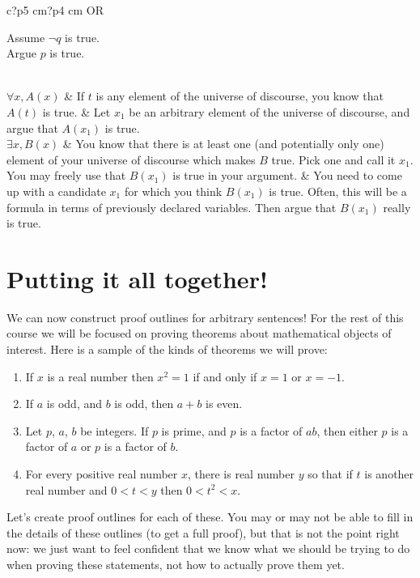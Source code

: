 \begin{table}[h]
\begin{tabular}{c?p{5 cm}?p{4 cm}}
		OR 
		
		\begin{fitch*}
			\textrm{Assume $\neg q$ is true.}\\
			\fa \textrm{Argue $p$ is true. }
		\end{fitch*}
		
		\\ \hline
		$\forall x, A(x)$ & If $t$ is any element of the universe of discourse, you know that $A(t)$ is true. &  Let $x_1$ be an arbitrary element of the universe of discourse, and argue that $A(x_1)$ is true. \\ \hline
		$\exists x, B(x)$ & You know that there is at least one (and potentially only one) element of your universe of discourse which makes $B$ true.  Pick one and call it $x_1$.  You may freely use that $B(x_1)$ is true in your argument. &  You need to come up with a candidate $x_1$ for which you think $B(x_1)$ is true.  Often, this will be a formula in terms of previously declared variables.  Then argue that $B(x_1)$ really is true.
	\end{tabular}
\end{table}

\newpage


\section{Putting it all together!}

We can now construct proof outlines for arbitrary sentences!  For the rest of this course we will be focused on proving theorems about mathematical objects of interest.  Here is a sample of the kinds of theorems we will prove:

\begin{enumerate}
		\item 	If $x$ is a real number then $x^2 = 1$ if and only if $x=1$ or $x=-1$.
		\item If $a$ is odd, and $b$ is odd, then $a+b$ is even.
		\item Let $p$, $a$, $b$ be integers.  If $p$ is prime, and $p$ is a factor of $ab$, then either $p$ is a factor of $a$ or $p$ is a factor of $b$.
		\item For every positive real number $x$, there is real number $y$ so that if $t$ is another real number and $0<t<y$ then $0<t^2<x$.
\end{enumerate}


Let's create proof outlines for each of these.  You may or may not be able to fill in the details of these outlines (to get a full proof), but that is not the point right now:  we just want to feel confident that we know what we should be trying to do when proving these statements, not how to actually prove them yet.

